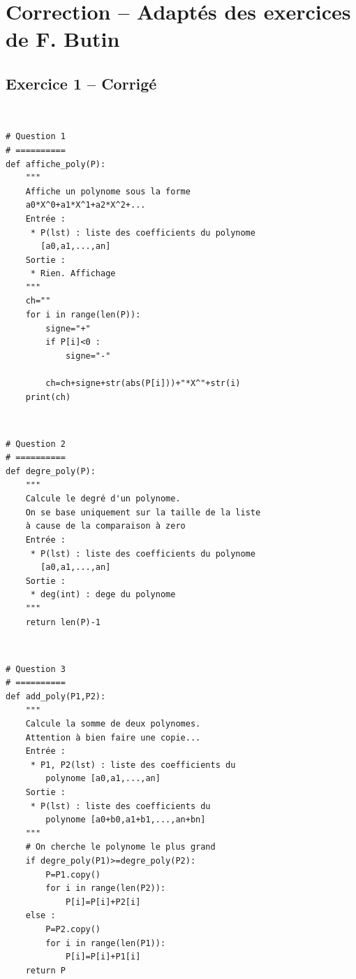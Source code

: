 \documentclass[10pt,fleqn]{article} %
\begin{document}
\section{Correction -- Adaptés des exercices de F. Butin}
\subsection*{Exercice 1 -- Corrigé}
\begin{corrige}
$\quad$
\begin{lstlisting}
# Question 1 
# ==========
def affiche_poly(P):
    """
    Affiche un polynome sous la forme 
    a0*X^0+a1*X^1+a2*X^2+...
    Entrée : 
     * P(lst) : liste des coefficients du polynome 
       [a0,a1,...,an]
    Sortie : 
     * Rien. Affichage
    """
    ch=""
    for i in range(len(P)):
        signe="+"
        if P[i]<0 :
            signe="-"
        
        ch=ch+signe+str(abs(P[i]))+"*X^"+str(i)
    print(ch)
\end{lstlisting}
\end{corrige}

\begin{corrige}
$\quad$
\begin{lstlisting}
# Question 2
# ==========
def degre_poly(P):
    """
    Calcule le degré d'un polynome.
    On se base uniquement sur la taille de la liste 
    à cause de la comparaison à zero
    Entrée : 
     * P(lst) : liste des coefficients du polynome 
       [a0,a1,...,an]
    Sortie : 
     * deg(int) : dege du polynome
    """
    return len(P)-1
\end{lstlisting}
\end{corrige}

\begin{corrige}
$\quad$
\begin{lstlisting}
# Question 3
# ==========
def add_poly(P1,P2):
    """
    Calcule la somme de deux polynomes.
    Attention à bien faire une copie...
    Entrée : 
     * P1, P2(lst) : liste des coefficients du 
        polynome [a0,a1,...,an]
    Sortie : 
     * P(lst) : liste des coefficients du 
        polynome [a0+b0,a1+b1,...,an+bn]
    """
    # On cherche le polynome le plus grand
    if degre_poly(P1)>=degre_poly(P2):
        P=P1.copy()
        for i in range(len(P2)):
            P[i]=P[i]+P2[i]
    else :
        P=P2.copy()
        for i in range(len(P1)):
            P[i]=P[i]+P1[i]
    return P
\end{lstlisting}
\end{corrige}
\end{document}
